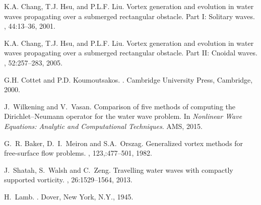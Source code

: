 \documentclass[a4paper,11pt]{article}
\begin{document}
\begin{thebibliography}{20}
K.A. Chang, T.J. Hsu, and P.L.F. Liu.
\newblock Vortex generation and evolution in water waves propagating over a
  submerged rectangular obstacle. {P}art {I}: Solitary waves.
, 44:13--36, 2001.

K.A. Chang, T.J. Hsu, and P.L.F. Liu.
\newblock Vortex generation and evolution in water waves propagating over a
  submerged rectangular obstacle. {P}art {II}: Cnoidal waves.
, 52:257--283, 2005.

G.H. Cottet and P.D. Koumoutsakos.
.
\newblock Cambridge University Press, Cambridge, 2000.

J.~Wilkening and V.~Vasan.
\newblock Comparison of five methods of computing the {D}irichlet--{N}eumann
  operator for the water wave problem.
\newblock In {\em Nonlinear Wave Equations: Analytic and Computational
  Techniques}. AMS, 2015.

G.~R. Baker, D.~I.~Meiron and S.A.~Orszag.
\newblock Generalized vortex methods for free-surface flow problems.
, 123,:477--501, 1982.

J.~Shatah, S.~Walsh and C.~Zeng.
\newblock Travelling water waves with compactly supported vorticity.
, 26:1529--1564, 2013.

H.~Lamb.
.
\newblock Dover, New York, N.Y., 1945.

\end{thebibliography}
\end{document}

